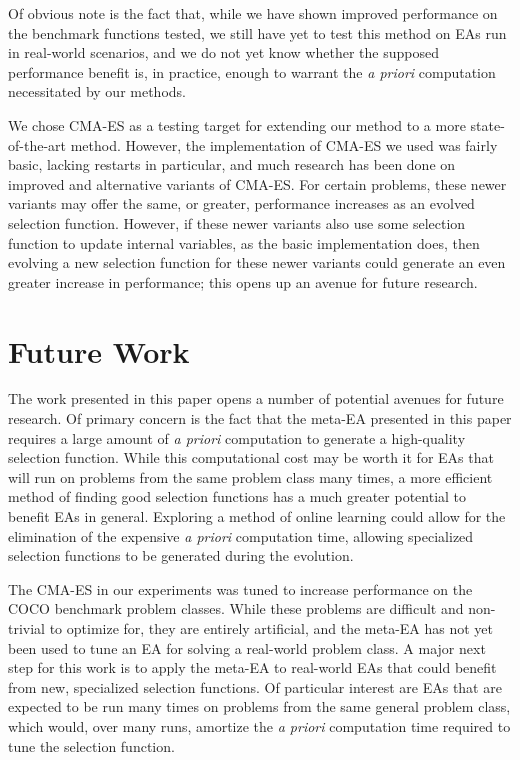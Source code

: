 \documentclass[sigconf]{acmart}
\begin{document}
Of obvious note is the fact that, while we have shown improved performance on the benchmark functions tested, we still have yet to test this method on EAs run in real-world scenarios, and we do not yet know whether the supposed performance benefit is, in practice, enough to warrant the \textit{a priori} computation necessitated by our methods.

We chose CMA-ES as a testing target for extending our method to a more state-of-the-art method. However, the implementation of CMA-ES we used was fairly basic, lacking restarts in particular, and much research has been done on improved and alternative variants of CMA-ES. For certain problems, these newer variants may offer the same, or greater, performance increases as an evolved selection function. However, if these newer variants also use some selection function to update internal variables, as the basic implementation does, then evolving a new selection function for these newer variants could generate an even greater increase in performance; this opens up an avenue for future research.

\section{Future Work}
\label{Future Work}
The work presented in this paper opens a number of potential avenues for future research. Of primary concern is the fact that the meta-EA presented in this paper requires a large amount of \textit{a priori} computation to generate a high-quality selection function. While this computational cost may be worth it for EAs that will run on problems from the same problem class many times, a more efficient method of finding good selection functions has a much greater potential to benefit EAs in general. Exploring a method of online learning could allow for the elimination of the expensive \textit{a priori} computation time, allowing specialized selection functions to be generated during the evolution.

The CMA-ES in our experiments was tuned to increase performance on the COCO benchmark problem classes. While these problems are difficult and non-trivial to optimize for, they are entirely artificial, and the meta-EA has not yet been used to tune an EA for solving a real-world problem class. A major next step for this work is to apply the meta-EA to real-world EAs that could benefit from new, specialized selection functions. Of particular interest are EAs that are expected to be run many times on problems from the same general problem class, which would, over many runs, amortize the \textit{a priori} computation time required to tune the selection function.
\end{document}
